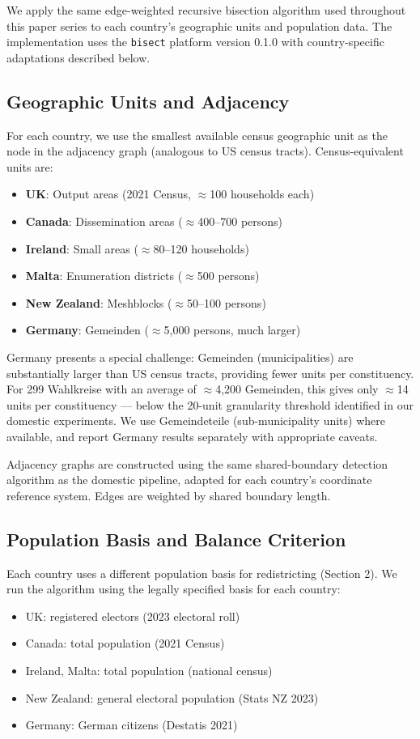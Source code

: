 We apply the same edge-weighted recursive bisection algorithm used throughout this paper series \citep{dellib2026edgeweighted} to each country's geographic units and population data. The implementation uses the \texttt{bisect} platform version 0.1.0 \citep{redistcli2026} with country-specific adaptations described below.

\subsection{Geographic Units and Adjacency}

For each country, we use the smallest available census geographic unit as the node in the adjacency graph (analogous to US census tracts). Census-equivalent units are:
\begin{itemize}
    \item \textbf{UK}: Output areas (2021 Census, $\approx$100 households each)
    \item \textbf{Canada}: Dissemination areas ($\approx$400--700 persons)
    \item \textbf{Ireland}: Small areas ($\approx$80--120 households)
    \item \textbf{Malta}: Enumeration districts ($\approx$500 persons)
    \item \textbf{New Zealand}: Meshblocks ($\approx$50--100 persons)
    \item \textbf{Germany}: Gemeinden ($\approx$5,000 persons, much larger)
\end{itemize}
Germany presents a special challenge: Gemeinden (municipalities) are substantially larger than US census tracts, providing fewer units per constituency. For 299 Wahlkreise with an average of $\approx$4,200 Gemeinden, this gives only $\approx$14 units per constituency --- below the 20-unit granularity threshold identified in our domestic experiments. We use Gemeindeteile (sub-municipality units) where available, and report Germany results separately with appropriate caveats.

Adjacency graphs are constructed using the same shared-boundary detection algorithm as the domestic pipeline, adapted for each country's coordinate reference system. Edges are weighted by shared boundary length.

\subsection{Population Basis and Balance Criterion}

Each country uses a different population basis for redistricting (Section 2). We run the algorithm using the legally specified basis for each country:
\begin{itemize}
    \item UK: registered electors (2023 electoral roll)
    \item Canada: total population (2021 Census)
    \item Ireland, Malta: total population (national census)
    \item New Zealand: general electoral population (Stats NZ 2023)
    \item Germany: German citizens (Destatis 2021)
\end{itemize}

